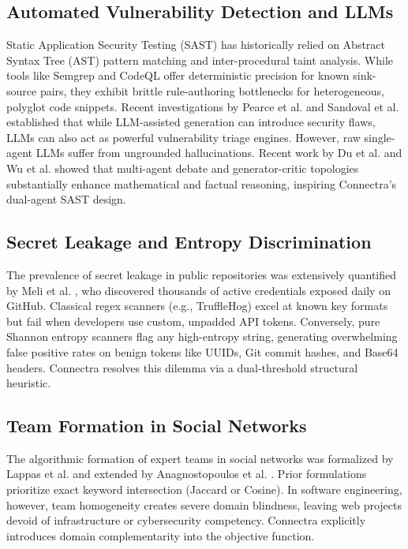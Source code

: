 \documentclass[journal,10pt,twocolumn]{IEEEtran}
\begin{document}
\subsection{Automated Vulnerability Detection and LLMs}
Static Application Security Testing (SAST) has historically relied on Abstract Syntax Tree (AST) pattern matching and inter-procedural taint analysis. While tools like Semgrep and CodeQL offer deterministic precision for known sink-source pairs, they exhibit brittle rule-authoring bottlenecks for heterogeneous, polyglot code snippets. Recent investigations by Pearce et al. \cite{pearce2022asleep} and Sandoval et al. \cite{sandoval2023lost} established that while LLM-assisted generation can introduce security flaws, LLMs can also act as powerful vulnerability triage engines. However, raw single-agent LLMs suffer from ungrounded hallucinations. Recent work by Du et al. \cite{du2024improving} and Wu et al. \cite{wu2023autogen} showed that multi-agent debate and generator-critic topologies substantially enhance mathematical and factual reasoning, inspiring Connectra's dual-agent SAST design.

\subsection{Secret Leakage and Entropy Discrimination}
The prevalence of secret leakage in public repositories was extensively quantified by Meli et al. \cite{meli2019how}, who discovered thousands of active credentials exposed daily on GitHub. Classical regex scanners (e.g., TruffleHog) excel at known key formats but fail when developers use custom, unpadded API tokens. Conversely, pure Shannon entropy scanners \cite{shannon1948mathematical} flag any high-entropy string, generating overwhelming false positive rates on benign tokens like UUIDs, Git commit hashes, and Base64 headers. Connectra resolves this dilemma via a dual-threshold structural heuristic.

\subsection{Team Formation in Social Networks}
The algorithmic formation of expert teams in social networks was formalized by Lappas et al. \cite{lappas2009finding} and extended by Anagnostopoulos et al. \cite{anagnostopoulos2012online}. Prior formulations prioritize exact keyword intersection (Jaccard or Cosine). In software engineering, however, team homogeneity creates severe domain blindness, leaving web projects devoid of infrastructure or cybersecurity competency. Connectra explicitly introduces domain complementarity into the objective function.
\end{document}
